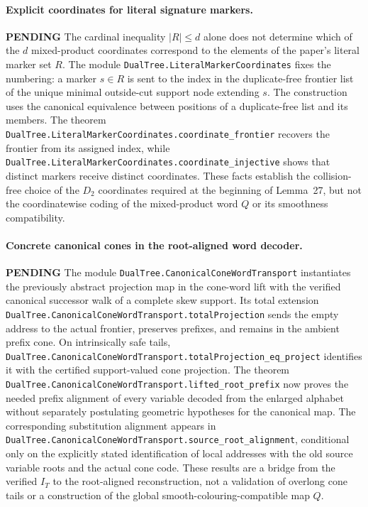 \documentclass[11pt]{article}
\newcommand{\todo}{\textcolor{gray!70!black}{\textbf{PENDING}}}
\newcommand{\lean}[1]{\texttt{#1}}
\begin{document}
\paragraph{Explicit coordinates for literal signature markers.} \todo
The cardinal inequality $|R|\le d$ alone does not determine which
of the $d$ mixed-product coordinates correspond to the elements of
the paper's literal marker set $R$.  The module
\lean{DualTree.LiteralMarkerCoordinates} fixes the numbering: a marker
$s\in R$ is sent to the index in the duplicate-free frontier list
of the unique minimal outside-cut support node extending $s$.
The construction uses the canonical equivalence between positions of
a duplicate-free list and its members.
The theorem
\lean{DualTree.LiteralMarkerCoordinates.coordinate_frontier}
recovers the frontier from its assigned index, while
\lean{DualTree.LiteralMarkerCoordinates.coordinate_injective}
shows that distinct markers receive distinct coordinates.
These facts establish the collision-free choice of the $D_2$
coordinates required at the beginning of Lemma~27, but not the
coordinatewise coding of the mixed-product word $Q$ or its smoothness
compatibility.

\paragraph{Concrete canonical cones in the root-aligned word decoder.} \todo
The module \lean{DualTree.CanonicalConeWordTransport} instantiates
the previously abstract projection map in the cone-word lift with the
verified canonical successor walk of a complete skew support.
Its total extension
\lean{DualTree.CanonicalConeWordTransport.totalProjection}
sends the empty address to the actual frontier, preserves prefixes,
and remains in the ambient prefix cone.  On intrinsically safe tails,
\lean{DualTree.CanonicalConeWordTransport.totalProjection_eq_project}
identifies it with the certified support-valued cone projection.
The theorem
\lean{DualTree.CanonicalConeWordTransport.lifted_root_prefix}
now proves the needed prefix alignment of every variable decoded from
the enlarged alphabet without separately postulating geometric
hypotheses for the canonical map.  The corresponding substitution
alignment appears in
\lean{DualTree.CanonicalConeWordTransport.source_root_alignment},
conditional only on the explicitly stated identification of local
addresses with the old source variable roots and the actual cone code.
These results are a bridge from the verified $I_T$ to the
root-aligned reconstruction, not a validation of overlong cone tails
or a construction of the global smooth-colouring-compatible map $Q$.
\end{document}
